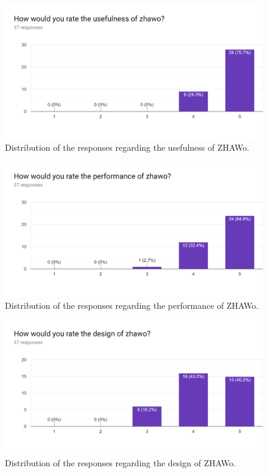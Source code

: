 \begin{markdown}
\begin{figure}[H]
  \includegraphics[width=13cm, center]{./figures/bar_1.png}
  \captionsetup{width=15.5cm}
  \caption [Usefulness Bar Diagram]{Distribution of the responses regarding the usefulness of ZHAWo.}
  \label{fig:BarUsefulness}
\end{figure}

\vspace{-5ex} %

\begin{figure}[H]
  \includegraphics[width=13cm, center]{./figures/bar_2.png}
  \captionsetup{width=15.5cm}
  \caption [Performance Bar Diagram]{Distribution of the responses regarding the performance of ZHAWo.}
  \label{fig:BarPerformance}
\end{figure}

\vspace{-5ex} %

\begin{figure}[H]
  \includegraphics[width=13cm, center]{./figures/bar_3.png}
  \captionsetup{width=15.5cm}
  \caption [Design Bar Diagram]{Distribution of the responses regarding the design of ZHAWo.}
  \label{fig:BarDesign}
\end{figure}


\end{markdown}
